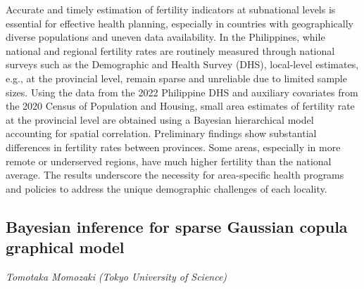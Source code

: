 \documentclass[
]{scrreprt}
\begin{document}
Accurate and timely estimation of fertility indicators at subnational
levels is essential for effective health planning, especially in
countries with geographically diverse populations and uneven data
availability. In the Philippines, while national and regional fertility
rates are routinely measured through national surveys such as the
Demographic and Health Survey (DHS), local-level estimates, e.g., at the
provincial level, remain sparse and unreliable due to limited sample
sizes. Using the data from the 2022 Philippine DHS and auxiliary
covariates from the 2020 Census of Population and Housing, small area
estimates of fertility rate at the provincial level are obtained using a
Bayesian hierarchical model accounting for spatial correlation.
Preliminary findings show substantial differences in fertility rates
between provinces. Some areas, especially in more remote or underserved
regions, have much higher fertility than the national average. The
results underscore the necessity for area-specific health programs and
policies to address the unique demographic challenges of each locality.

\subsection{Bayesian inference for sparse Gaussian copula graphical
model}\label{bayesian-inference-for-sparse-gaussian-copula-graphical-model}

\emph{Tomotaka Momozaki} \emph{(Tokyo
University of Science)}

\setlength{\parskip}{0.5em}
\end{document}
